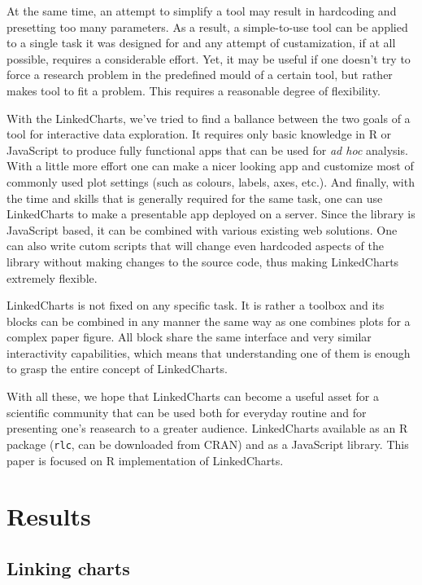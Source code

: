\documentclass[twocolumn,10pt]{article}
\begin{document}
At the same time, an attempt to simplify a tool may result in hardcoding and presetting too many parameters. As a result, a simple-to-use tool can be applied to a single task it was designed for and any attempt of custamization, if at all possible, requires a considerable effort. Yet, it may be useful if one doesn't try to force a research problem in the predefined mould of a certain tool, but rather makes tool to fit a problem. This requires a reasonable degree of flexibility.

With the LinkedCharts, we've tried to find a ballance between the two goals of a tool for interactive data exploration. It requires only basic knowledge in R or JavaScript to produce fully functional apps that can be used for \emph{ad hoc} analysis. With a little more effort one can make a nicer looking app and customize most of commonly used plot settings (such as colours, labels, axes, etc.). And finally, with the time and skills that is generally required for the same task, one can use LinkedCharts to make a presentable app deployed on a server. Since the library is JavaScript based, it can be combined with various existing web solutions. One can also write cutom scripts that will change even hardcoded aspects of the library without making changes to the source code, thus making LinkedCharts extremely flexible. 

LinkedCharts is not fixed on any specific task. It is rather a toolbox and its blocks can be combined in any manner the same way as one combines plots for a complex paper figure. All block share the same interface and very similar interactivity capabilities, which means that understanding one of them is enough to grasp the entire concept of LinkedCharts.

With all these, we hope that LinkedCharts can become a useful asset for a scientific community that can be used both for everyday routine and for presenting one's reasearch to a greater audience. LinkedCharts available as an R package (\texttt{rlc}, can be downloaded from CRAN) and as a JavaScript library. This paper is focused on R implementation of LinkedCharts. 

\section{Results}
\subsection{Linking charts}
\end{document}
